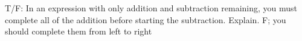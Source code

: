 {T/F: In an expression with only addition and subtraction remaining, you must complete all of the addition before starting the subtraction. Explain.}
{F; you should complete them from left to right}
